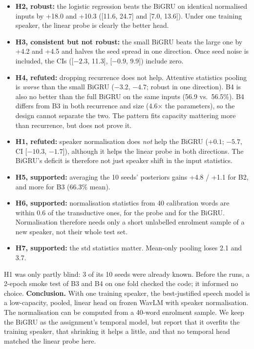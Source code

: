 \begin{itemize}\setlength\itemsep{1pt}
\item \textbf{H2, robust:} the logistic regression beats the BiGRU on identical normalised inputs by +18.0 and +10.3\pp{} ([11.6, 24.7] and [7.0, 13.6]). Under one training speaker, the linear probe is clearly the better head.
\item \textbf{H3, consistent but not robust:} the small BiGRU beats the large one by +4.2 and +4.5\pp{} and halves the seed spread in one direction. Once seed noise is included, the CIs ([$-2.3$, 11.3], [$-0.9$, 9.9]) include zero.
\item \textbf{H4, refuted:} dropping recurrence does not help. Attentive statistics pooling is \emph{worse} than the small BiGRU ($-3.2$, $-4.7$\pp; robust in one direction). B4 is also no better than the full BiGRU on the same inputs (56.9 vs.\ 56.5\%). B4 differs from B3 in both recurrence and size (4.6$\times$ the parameters), so the design cannot separate the two. The pattern fits capacity mattering more than recurrence, but does not prove it.
\item \textbf{H1, refuted:} speaker normalisation does \emph{not} help the BiGRU ($+0.1$\pp; $-5.7$\pp, CI [$-10.3$, $-1.7$]), although it helps the linear probe in both directions. The BiGRU's deficit is therefore not just speaker shift in the input statistics.
\item \textbf{H5, supported:} averaging the 10 seeds' posteriors gains +4.8 / +1.1\pp{} for B2, and more for B3 (66.3\% mean).
\item \textbf{H6, supported:} normalisation statistics from 40 calibration words are within 0.6\pp{} of the transductive ones, for the probe and for the BiGRU. Normalisation therefore needs only a short unlabelled enrolment sample of a new speaker, not their whole test set.
\item \textbf{H7, supported:} the std statistics matter. Mean-only pooling loses 2.1 and 3.7\pp.
\end{itemize}
H1 was only partly blind: 3 of its 10 seeds were already known.
Before the runs, a 2-epoch smoke test of B3 and B4 on one fold checked the code; it informed no choice.
\textbf{Conclusion.} With one training speaker, the best-justified speech model is a low-capacity, pooled, linear head on frozen WavLM with speaker normalisation. The normalisation can be computed from a 40-word enrolment sample.
We keep the BiGRU as the assignment's temporal model, but report that it overfits the training speaker, that shrinking it helps a little, and that no temporal head matched the linear probe here.


